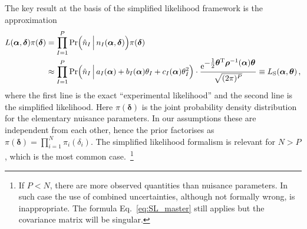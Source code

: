 \documentclass[11pt]{article}
\begin{document}
The key result at the basis of  the simplified likelihood framework is the approximation
\begin{align}
  L(\bm{\alpha},\bm{\delta} )\pi(\bm{\delta})
  & = \prod_{I=1}^P \mathrm{Pr}\Big(  \hat{n}_I\,\Big|\,n_I(\bm{\alpha},\bm{\delta})  \Big) \pi(\bm{\delta}) \label{eq:EL} \\
  & \approx \prod_{I=1}^P \mathrm{Pr}\Big( \hat{n}_I\,\Big|\,a_{I}(\bm \alpha)+b_I(\bm \alpha)\theta_I+c_I(\bm \alpha)\theta_I^2  \Big) \cdot
    \frac{ \mathrm{e}^{{\textstyle-\frac{1}{2}\bm \theta^{\rm T} \bm{\rho}^{-1}(\bm \alpha) \bm \theta}}}{\sqrt{(2\pi)^P }}  \equiv L_{\rm{S}}(\bm{\alpha},\bm{\theta})\,, \label{eq:SL_master}
\end{align}
where the first line is the exact ``experimental likelihood'' and the second line is the simplified likelihood. Here $\pi(\bm \delta)$ is the joint probability density distribution for the elementary nuisance parameters. In our assumptions  these are independent from each other, hence the prior factorises as $\pi(\bm \delta)=\prod_{i=1}^N \pi_i(\delta_i)$. The simplified likelihood formalism  is relevant for $N>P$, which is the most common case.~\footnote{If $P<N$, there are more observed quantities than nuisance parameters.
 In such case the use of combined uncertainties, although not formally wrong, is inappropriate.
  The formula Eq.~\eqref{eq:SL_master} still applies but the covariance matrix will be singular.
}
\end{document}
